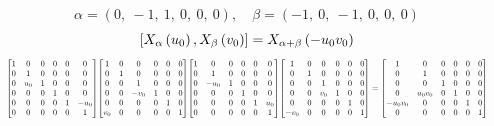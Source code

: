 \documentclass[11pt]{article}
\theoremstyle{definition}
\begin{document}
\[
\alpha = \left( 0, \  -1, \  1, \  0, \  0, \  0\right), \quad \beta = \left( -1, \  0, \  -1, \  0, \  0, \  0\right)
\]
\[
\scaletoalign{\textwidth}{\left[ X_{\alpha}\left(u_{0}\right), X_{\beta}\left(v_{0}\right) \right] = X_{\alpha + \beta}\left(- u_{0} v_{0}\right)}
\]
\[
\scaletoalign{\textwidth}{{\left[\begin{matrix}1 & 0 & 0 & 0 & 0 & 0\\0 & 1 & 0 & 0 & 0 & 0\\0 & u_{0} & 1 & 0 & 0 & 0\\0 & 0 & 0 & 1 & 0 & 0\\0 & 0 & 0 & 0 & 1 & - u_{0}\\0 & 0 & 0 & 0 & 0 & 1\end{matrix}\right]} {\left[\begin{matrix}1 & 0 & 0 & 0 & 0 & 0\\0 & 1 & 0 & 0 & 0 & 0\\0 & 0 & 1 & 0 & 0 & 0\\0 & 0 & - v_{0} & 1 & 0 & 0\\0 & 0 & 0 & 0 & 1 & 0\\v_{0} & 0 & 0 & 0 & 0 & 1\end{matrix}\right]} {\left[\begin{matrix}1 & 0 & 0 & 0 & 0 & 0\\0 & 1 & 0 & 0 & 0 & 0\\0 & - u_{0} & 1 & 0 & 0 & 0\\0 & 0 & 0 & 1 & 0 & 0\\0 & 0 & 0 & 0 & 1 & u_{0}\\0 & 0 & 0 & 0 & 0 & 1\end{matrix}\right]} {\left[\begin{matrix}1 & 0 & 0 & 0 & 0 & 0\\0 & 1 & 0 & 0 & 0 & 0\\0 & 0 & 1 & 0 & 0 & 0\\0 & 0 & v_{0} & 1 & 0 & 0\\0 & 0 & 0 & 0 & 1 & 0\\- v_{0} & 0 & 0 & 0 & 0 & 1\end{matrix}\right]} = {\left[\begin{matrix}1 & 0 & 0 & 0 & 0 & 0\\0 & 1 & 0 & 0 & 0 & 0\\0 & 0 & 1 & 0 & 0 & 0\\0 & u_{0} v_{0} & 0 & 1 & 0 & 0\\- u_{0} v_{0} & 0 & 0 & 0 & 1 & 0\\0 & 0 & 0 & 0 & 0 & 1\end{matrix}\right]}}
\]
\end{document}
